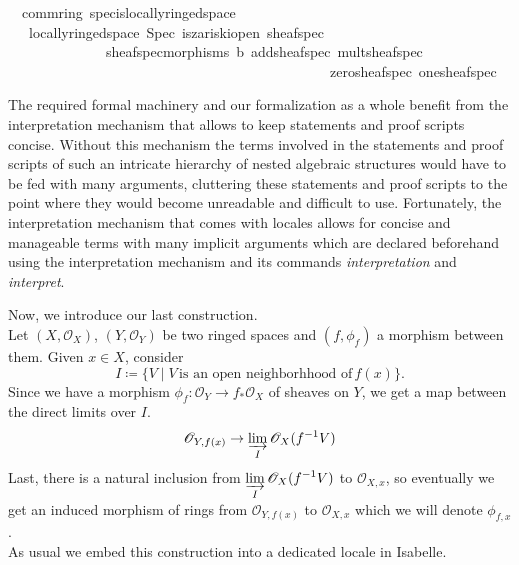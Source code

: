 \documentclass[12pt]{scrartcl}
\begin{document}
\begin{isabelle}
\isamarkupfalse%
\ {\isacharparenleft}{\kern0pt}\ comm{\isacharunderscore}{\kern0pt}ring{\isacharparenright}{\kern0pt}\ spec{\isacharunderscore}{\kern0pt}is{\isacharunderscore}{\kern0pt}locally{\isacharunderscore}{\kern0pt}ringed{\isacharunderscore}{\kern0pt}space{\isacharcolon}{\kern0pt}\isanewline
\ \ \ {\isachardoublequoteopen}locally{\isacharunderscore}{\kern0pt}ringed{\isacharunderscore}{\kern0pt}space\ Spec\ is{\isacharunderscore}{\kern0pt}zariski{\isacharunderscore}{\kern0pt}open\ sheaf{\isacharunderscore}{\kern0pt}spec\ \isanewline
\ \ \ \ \ \ \ \ \ \ \ \ \ \ sheaf{\isacharunderscore}{\kern0pt}spec{\isacharunderscore}{\kern0pt}morphisms\ {\isasymO}b\ add{\isacharunderscore}{\kern0pt}sheaf{\isacharunderscore}{\kern0pt}spec\ mult{\isacharunderscore}{\kern0pt}sheaf{\isacharunderscore}{\kern0pt}spec\ \isanewline
\ \ \ \ \ \ \ \ \ \ \ \ \ \ \ \ \ \ \ \ \ \ \ \ \ \ \ \ \ \ \ \ \ \ \ \ \ \ \ \ \ \ \ \ \ \ zero{\isacharunderscore}{\kern0pt}sheaf{\isacharunderscore}{\kern0pt}spec\ one{\isacharunderscore}{\kern0pt}sheaf{\isacharunderscore}{\kern0pt}spec{\isachardoublequoteclose}
\end{isabelle}

The required formal machinery and our formalization as a whole benefit from the interpretation mechanism that allows to keep statements and proof scripts concise. Without this mechanism the terms involved in the statements and proof scripts of such an intricate hierarchy of nested algebraic structures would have to be fed with many arguments, cluttering these statements and proof scripts to the point where they would become unreadable and difficult to use. Fortunately, the interpretation mechanism that comes with locales allows for concise and manageable terms with many implicit arguments which are declared beforehand using the interpretation mechanism and its commands \textit{interpretation} and \textit{interpret}.
  
Now, we introduce our last construction. \\
	Let $(X, \mathscr{O}_X)$, $(Y, \mathscr{O}_Y)$ be two ringed spaces and $(f, \phi_f)$ a morphism between them. Given $x \in X$, consider 
	\[
	I \coloneqq \lbrace V \mid V \, \text{is an open neighborhhood of}\, f(x) \rbrace .
	\]
	Since we have a morphism $\phi_f: \mathscr{O}_Y \rightarrow f_* \mathscr{O}_X $ of sheaves on $Y$, we get a map between the direct limits over $I$. 
	\[
	\mathscr{O}_{Y, f(x)} \rightarrow \displaystyle \varinjlim_I \mathscr{O}_X (f^{-1} V)
	\]
	Last, there is a natural inclusion from $\displaystyle \varinjlim_I \mathscr{O}_X (f^{-1} V)$ to $\mathscr{O}_{X, x}$, so eventually we get an induced morphism of rings from $\mathscr{O}_{Y, f(x)}$ to $\mathscr{O}_{X, x}$ which we will denote $\phi_{f, x}$. \\	
As usual we embed this construction into a dedicated locale in Isabelle.
\end{document}
